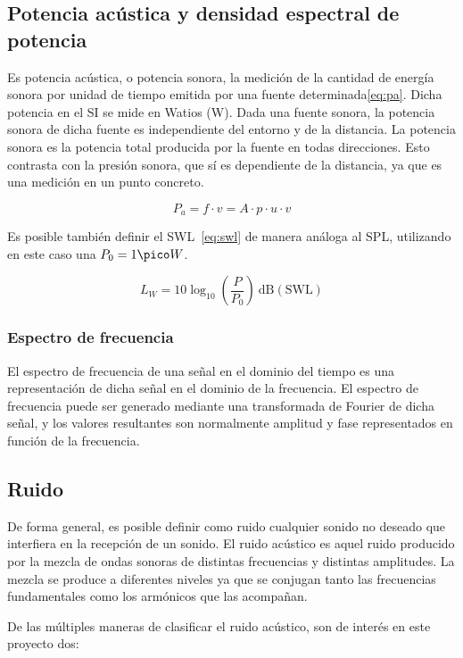 \subsection{Potencia acústica y densidad espectral de potencia }
Es potencia acústica, o potencia sonora, la medición de la cantidad de energía sonora por unidad de tiempo emitida por una fuente determinada\ref{eq:pa}. Dicha potencia en el \ac{SI} se mide en Watios (W). Dada una fuente sonora, la potencia sonora de dicha fuente es independiente del entorno y de la distancia. La potencia sonora es la potencia total producida por la fuente en todas direcciones. Esto contrasta con la presión sonora, que sí es dependiente de la distancia, ya que es una medición en un punto concreto.

\begin{equation}
P_a = f \cdot v = A \cdot p \cdot u \cdot v
\label{eq:pa}
\end{equation}

Es posible también definir el \ac{SWL}~\ref{eq:swl} de manera análoga al \ac{SPL}, utilizando en este caso una $P_0 = 1 \pico W$. 

\begin{equation}
L_W = 10 \log_{10}\left(\frac{P}{P_0}\right) ~\mathrm{dB (SWL)}
\label{eq:swl}
\end{equation}

\subsubsection{Espectro de frecuencia}
El espectro de frecuencia de una señal en el dominio del tiempo es una representación de dicha señal en el dominio de la frecuencia. El espectro de frecuencia puede ser generado mediante una transformada de Fourier de dicha señal, y los valores resultantes son normalmente amplitud y fase representados en función de la frecuencia.

\subsection{Ruido}
De forma general, es posible definir como ruido cualquier sonido no deseado que interfiera en la recepción de un sonido. El ruido acústico es aquel ruido producido por la mezcla de ondas sonoras de distintas frecuencias y distintas amplitudes. La mezcla se produce a diferentes niveles ya que se conjugan tanto las frecuencias fundamentales como los armónicos que las acompañan.

De las múltiples maneras de clasificar el ruido acústico, son de interés en este proyecto dos:

